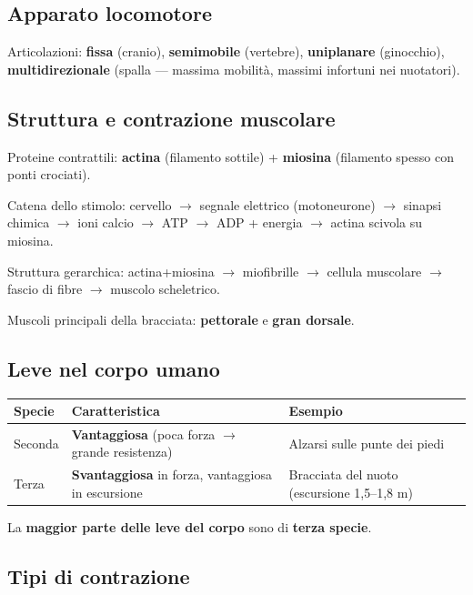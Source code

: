 \documentclass[12pt, a4paper]{article}
\begin{document}
\subsection{Apparato locomotore}

Articolazioni: \textbf{fissa} (cranio), \textbf{semimobile} (vertebre), \textbf{uniplanare} (ginocchio), \textbf{multidirezionale} (spalla --- massima mobilità, massimi infortuni nei nuotatori).

\subsection{Struttura e contrazione muscolare}

Proteine contrattili: \textbf{actina} (filamento sottile) + \textbf{miosina} (filamento spesso con ponti crociati).

Catena dello stimolo: cervello $\rightarrow$ segnale elettrico (motoneurone) $\rightarrow$ sinapsi chimica $\rightarrow$ ioni calcio $\rightarrow$ ATP $\rightarrow$ ADP + energia $\rightarrow$ actina scivola su miosina.

Struttura gerarchica: actina+miosina $\rightarrow$ miofibrille $\rightarrow$ cellula muscolare $\rightarrow$ fascio di fibre $\rightarrow$ muscolo scheletrico.

Muscoli principali della bracciata: \textbf{pettorale} e \textbf{gran dorsale}.

\subsection{Leve nel corpo umano}

\begin{tabularx}{\textwidth}{llX}
\toprule
\rowcolor{light} \textbf{Specie} & \textbf{Caratteristica} & \textbf{Esempio} \\
\midrule
Seconda & \textbf{Vantaggiosa} (poca forza $\rightarrow$ grande resistenza) & Alzarsi sulle punte dei piedi \\
Terza & \textbf{Svantaggiosa} in forza, vantaggiosa in escursione & Bracciata del nuoto (escursione 1,5--1,8 m) \\
\bottomrule
\end{tabularx}

La \textbf{maggior parte delle leve del corpo} sono di \textbf{terza specie}.

\subsection{Tipi di contrazione}
\end{document}
